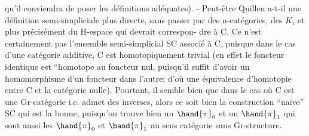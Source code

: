 qu'il conviendra de poser les définitions adéquates). - Peut-être Quillen
 \margin{$\|$}a-t-il une définition semi-simpliciale plus directe, sans passer par des
n-catégories, des $K_i$ et plus précisément du H-espace qui devrait correspon-%
dre à C.  Ce n'est certainement pas  l'ensemble semi-simplicial
SC  associé à C, puisque dans le cas d'une catégorie additive,
C est homotopiquement trivial (en effet le foncteur identique est ``homotope
au foncteur nul, puisqu'il suffit d'avoir un homomorphisme d'un foncteur
dans l'autre; d'où une équivalence d'homotopie entre C et la catégorie
nulle). Pourtant, il semble bien que dans le cas où C est une Gr-catégorie
\margin{\unsure{$\xi$|$\zeta$}} \margin{$|$}i.e. admet des inverses, alors ce soit bien la construction ``naïve'' SC qui
est la bonne, puisqu'on trouve bien un $\hand{\pi}_0$ et un $\hand{\pi}_1$ qui sont aussi les
$\hand{\pi}_0$ et $\hand{\pi}_1$ au sens  catégorie sans Gr-structure.


